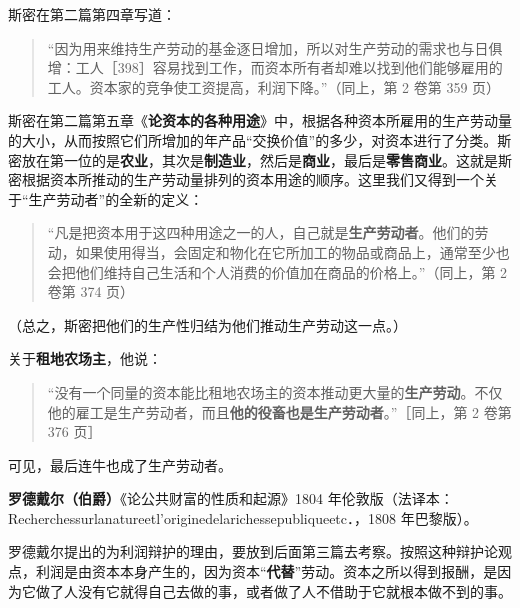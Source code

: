 斯密在第二篇第四章写道：

\begin{quote}“因为用来维持生产劳动的基金逐日增加，所以对生产劳动的需求也与日俱增：工人［398］容易找到工作，而资本所有者却难以找到他们能够雇用的工人。资本家的竞争使工资提高，利润下降。”（同上，第 2 卷第 359 页）\end{quote}

斯密在第二篇第五章《\textbf{论资本的各种用途}》中，根据各种资本所雇用的生产劳动量的大小，从而按照它们所增加的年产品“交换价值”的多少，对资本进行了分类。斯密放在第一位的是\textbf{农业}，其次是\textbf{制造业}，然后是\textbf{商业}，最后是\textbf{零售商业}。这就是斯密根据资本所推动的生产劳动量排列的资本用途的顺序。这里我们又得到一个关于“生产劳动者”的全新的定义：

\begin{quote}“凡是把资本用于这四种用途之一的人，自己就是\textbf{生产劳动者}。他们的劳动，如果使用得当，会固定和物化在它所加工的物品或商品上，通常至少也会把他们维持自己生活和个人消费的价值加在商品的价格上。”（同上，第 2 卷第 374 页）\end{quote}

（总之，斯密把他们的生产性归结为他们推动生产劳动这一点。）

关于\textbf{租地农场主}，他说：

\begin{quote}“没有一个同量的资本能比租地农场主的资本推动更大量的\textbf{生产劳动}。不仅他的雇工是生产劳动者，而且\textbf{他的役畜也是生产劳动者}。”［同上，第 2 卷第 376 页］\end{quote}

可见，最后连牛也成了生产劳动者。


\textbf{罗德戴尔（伯爵）}《论公共财富的性质和起源》1804 年伦敦版（法译本：Recherchessurlanatureetl’originedelarichessepubliqueetc．，1808 年巴黎版）。

罗德戴尔提出的为利润辩护的理由，要放到后面第三篇去考察。按照这种辩护论观点，利润是由资本本身产生的，因为资本“\textbf{代替}”劳动。资本之所以得到报酬，是因为它做了人没有它就得自己去做的事，或者做了人不借助于它就根本做不到的事。

